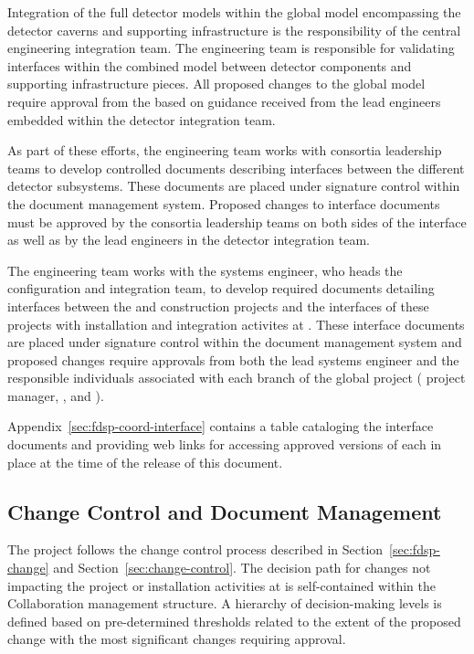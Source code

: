 Integration of the full detector models within the global model
encompassing the detector caverns and supporting infrastructure
is the responsibility of the central  engineering 
integration team.  The  engineering team is responsible 
for validating interfaces within the combined model between 
 detector components and supporting infrastructure 
pieces.  All proposed changes to the global model require approval 
from the  based on guidance received from the lead 
engineers embedded within the  detector integration team.

As part of these efforts, the engineering team works 
with consortia leadership teams to develop controlled 
documents describing interfaces between the different detector 
subsystems.  These documents are placed under signature control 
within the  document management system.  
Proposed changes to interface documents must be approved by 
the consortia leadership teams on both sides of the interface 
as well as by the lead engineers in the  
detector integration team.

The  engineering team works with the
 systems engineer, who heads the  
configuration and integration team, to develop required documents 
detailing interfaces between the  and  
 construction projects and the interfaces of these 
projects with  installation and integration
activites at .  These  interface 
documents are placed under signature control within the 
 document management system and proposed 
changes require approvals from both the lead  
systems engineer and the responsible individuals associated 
with each branch of the global project ( project 
manager,  , and ).

Appendix~\ref{sec:fdsp-coord-interface} contains a table 
cataloging the  interface documents 
and providing web links for accessing approved versions 
of each in place at the time of the release of this document.
 
\subsection{Change Control and Document Management}
\label{sec:tc_change control}

The  project follows the  change control
process described in Section~\ref{sec:fdsp-change} and
Section~\ref{sec:change-control}.  The decision path for changes not
impacting the  project or  
installation activities at  is self-contained within
the  Collaboration management structure.  A hierarchy of
decision-making levels is defined based on pre-determined thresholds
related to the extent of the proposed change with the most significant
changes requiring   approval.

